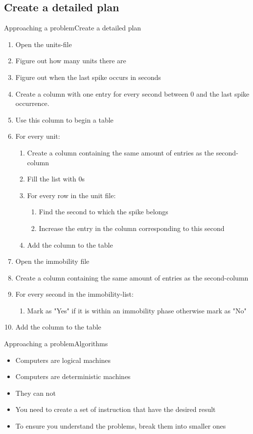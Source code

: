 \documentclass[aspectratio=169]{beamer}
\begin{document}
\subsection{Create a detailed plan}
\begin{frame}{Approaching a problem}{Create a detailed plan}
\begin{enumerate}
\item {Open the units-file}
\item {Figure out how many units there are}
\item {Figure out when the last spike occurs in seconds}
\item {Create a column with one entry for every second between 0 and the last spike occurrence.}
\item {Use this column to begin a table}
\item {For every unit:}
\begin{enumerate}
	\item {Create a column containing the same amount of entries as the second-column}
	\item {Fill the list with 0s}
	\item {For every row in the unit file:}
	\begin{enumerate}
		\item {Find the second to which the spike belongs}
		\item {Increase the entry in the column corresponding to this second}
	\end{enumerate}
\item {Add the column to the table}
\end{enumerate}
\item {Open the immobility file}
\item {Create a column containing the same amount of entries as the second-column}
\item {For every second in the immobility-list:}
\begin{enumerate}
	\item {Mark as "Yes" if it is within an immobility phase otherwise mark as "No"}
\end{enumerate}
\item {Add the column to the table}
\end{enumerate}
\end{frame}

\begin{frame}{Approaching a problem}{Algorithms}
\begin{itemize}
	\item Computers are logical machines
	\item Computers are deterministic machines
	\item They can not 
	\item You need to create a set of instruction that have the desired result
	\item To ensure you understand the problems, break them into smaller ones
\end{itemize}
\end{frame}
\end{document}
